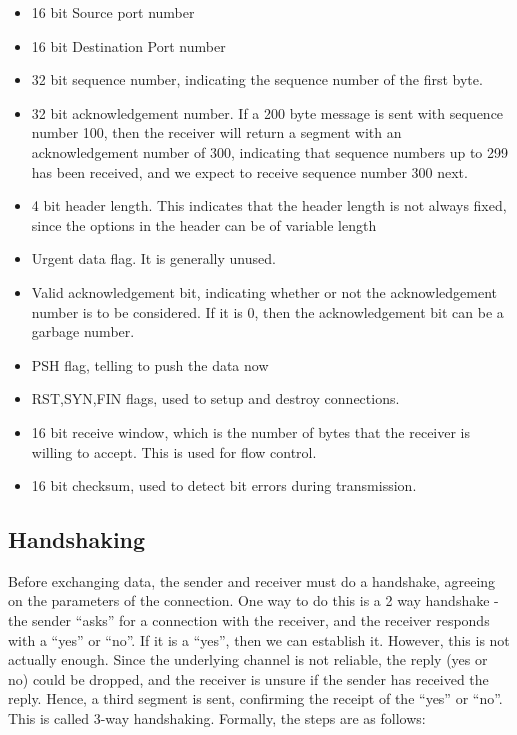 \documentclass[12pt,letterpaper]{amsbook}
\theoremstyle{definition}
\begin{document}
\begin{itemize}
  \item 16 bit Source port number
  \item 16 bit Destination Port number
  \item 32 bit sequence number, indicating the sequence number of the first byte.
  \item 32 bit acknowledgement number. If a 200 byte message is sent with sequence number 100, then the receiver will return a segment with an acknowledgement number of 300, indicating that sequence numbers up to 299 has been received, and we expect to receive sequence number 300 next.
  \item 4 bit header length. This indicates that the header length is not always fixed, since the options in the header can be of variable length
  \item Urgent data flag. It is generally unused.
  \item Valid acknowledgement bit, indicating whether or not the acknowledgement number is to be considered. If it is 0, then the acknowledgement bit can be a garbage number.
  \item PSH flag, telling to push the data now
  \item RST,SYN,FIN flags, used to setup and destroy connections.
  \item 16 bit receive window, which is the number of bytes that the receiver is willing to accept. This is used for flow control.
  \item 16 bit checksum, used to detect bit errors during transmission.
\end{itemize}

\subsection{Handshaking}

Before exchanging data, the sender and receiver must do a handshake, agreeing on the parameters of the connection. One way to do this is a 2 way handshake - the sender ``asks'' for a connection with the receiver, and the receiver responds with a ``yes'' or ``no''. If it is a ``yes'', then we can establish it. However, this is not actually enough. Since the underlying channel is not reliable, the reply (yes or no) could be dropped, and the receiver is unsure if the sender has received the reply. Hence, a third segment is sent, confirming the receipt of the ``yes'' or ``no''. This is called 3-way handshaking. Formally, the steps are as follows:
\end{document}

